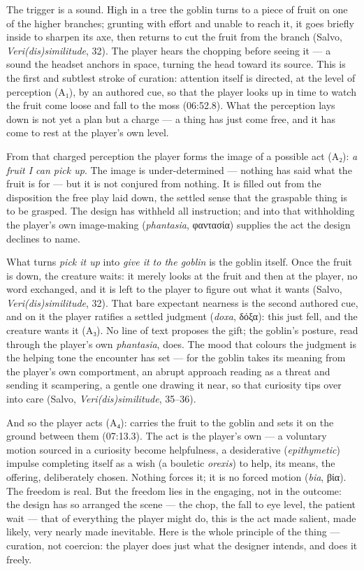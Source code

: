 \documentclass{article}
\newcommand{\gk}[1]{{\greekfont #1}}
\begin{document}
The trigger is a sound. High in a tree the goblin turns to a piece of fruit on one of the higher branches; grunting with effort and unable to reach it, it goes briefly inside to sharpen its axe, then returns to cut the fruit from the branch (Salvo, \textit{Veri(dis)similitude}, 32). The player hears the chopping before seeing it — a sound the headset anchors in space, turning the head toward its source. This is the first and subtlest stroke of curation: attention itself is directed, at the level of perception (A₁), by an authored cue, so that the player looks up in time to watch the fruit come loose and fall to the moss (06:52.8). What the perception lays down is not yet a plan but a charge — a thing has just come free, and it has come to rest at the player's own level.

From that charged perception the player forms the image of a possible act (A₂): \textit{a fruit I can pick up}. The image is under-determined — nothing has said what the fruit is for — but it is not conjured from nothing. It is filled out from the disposition the free play laid down, the settled sense that the graspable thing is to be grasped. The design has withheld all instruction; and into that withholding the player's own image-making (\textit{phantasia}, \gk{φαντασία}) supplies the act the design declines to name.

What turns \textit{pick it up} into \textit{give it to the goblin} is the goblin itself. Once the fruit is down, the creature waits: it merely looks at the fruit and then at the player, no word exchanged, and it is left to the player to figure out what it wants (Salvo, \textit{Veri(dis)similitude}, 32). That bare expectant nearness is the second authored cue, and on it the player ratifies a settled judgment (\textit{doxa}, \gk{δόξα}): this just fell, and the creature wants it (A₃). No line of text proposes the gift; the goblin's posture, read through the player's own \textit{phantasia}, does. The mood that colours the judgment is the helping tone the encounter has set — for the goblin takes its meaning from the player's own comportment, an abrupt approach reading as a threat and sending it scampering, a gentle one drawing it near, so that curiosity tips over into care (Salvo, \textit{Veri(dis)similitude}, 35–36).

And so the player acts (A₄): carries the fruit to the goblin and sets it on the ground between them (07:13.3). The act is the player's own — a voluntary motion sourced in a curiosity become helpfulness, a desiderative (\textit{epithymetic}) impulse completing itself as a wish (a bouletic \textit{orexis}) to help, its means, the offering, deliberately chosen. Nothing forces it; it is no forced motion (\textit{bia}, \gk{βία}). The freedom is real. But the freedom lies in the engaging, not in the outcome: the design has so arranged the scene — the chop, the fall to eye level, the patient wait — that of everything the player might do, this is the act made salient, made likely, very nearly made inevitable. Here is the whole principle of the thing — curation, not coercion: the player does just what the designer intends, and does it freely.
\end{document}
